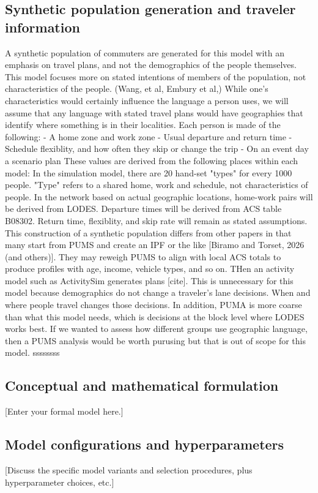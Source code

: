 \documentclass[11pt,letterpaper]{article}
\begin{document}
\subsection{Synthetic population generation and traveler information}
A synthetic population of commuters are generated for this model with an emphasis on travel plans, and not the demographics of the people themselves. This
model focuses more on stated intentions of members of the population, not characteristics of the people. (Wang, et al, Embury et al,) While one's
characteristics would certainly influence the language a person uses, we will assume that any language with stated travel plans would have geographies 
that identify where something is in their localities. Each person is made of the following:
    - A home zone and work zone
    - Usual departure and return time
    - Schedule flexiblity, and how often they skip or change the trip
    - On an event day a scenario plan
These values are derived from the following places within each model: In the simulation model, there are 20 hand-set "types" for every 1000 people. "Type" 
refers to a shared home, work and schedule, not characteristics of people. In the network based on actual geographic locations, home-work pairs will be
derived from LODES. Departure times will be derived from ACS table B08302. Return time, flexiblity, and skip rate will remain as stated assumptions. This
construction of a synthetic population differs from other papers in that many start from PUMS and create an IPF or the like [Biramo and Torset, 2026 
(and others)]. They may reweigh PUMS to align with local ACS totals to produce profiles with age, income, vehicle types, and so on. THen an activity model
such as ActivitySim generates plans [cite]. This is unnecessary for this model because demographics do not change a traveler's lane decisions. When and where
people travel changes those decisions. In addition, PUMA is more coarse than what this model needs, which is decisions at the block level where LODES works best. 
If we wanted to assess how different groups use geographic language, then a PUMS analysis would be worth purusing but that is out of scope for this model. ssssssss
\subsection{Conceptual and mathematical formulation}
[Enter your formal model here.]
\subsection{Model configurations and hyperparameters}
[Discuss the specific model variants and selection procedures, plus hyperparameter choices, etc.]
\end{document}
